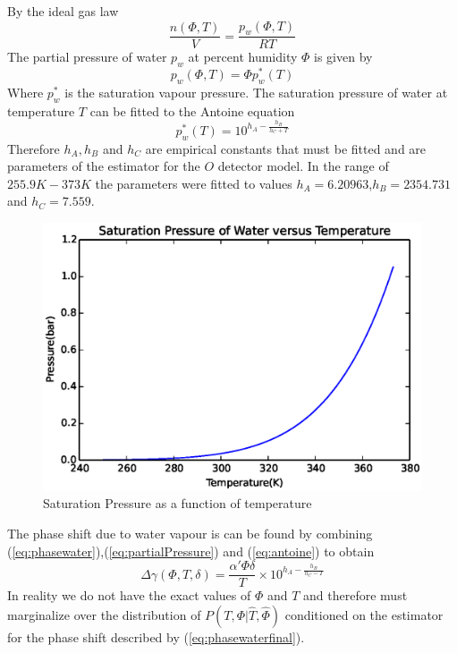 By the ideal gas law 
\begin{equation}
\frac{n(\Phi,T)}{V} = \frac{p_w(\Phi,T)}{RT}
\end{equation}
The partial pressure of water $p_w$ at percent humidity $\Phi$ is given by 
\begin{equation}
p_w(\Phi,T) = \Phi p^*_w(T)
\label{eq:partialPressure}
\end{equation}
Where $p^*_w$ is the saturation vapour pressure.\cite{relativehumidity} The saturation pressure of water at temperature $T$ can be fitted to the Antoine equation \cite{antoineequation}
\begin{equation}
\label{eq:antoine}
p^*_w(T) = 10^{h_A - \frac{h_B}{h_C + T}}
\end{equation} 
Therefore $h_A,h_B$ and $h_C$ are empirical constants that must be fitted and are parameters of the estimator for the $O$ detector model. In the range of $255.9K-373K$ the parameters were fitted to values $h_A=6.20963$,$h_B=2354.731$ and $h_C=7.559$.\cite{antoineequation} 
\begin{figure}[ht!]
\centering
\includegraphics[scale=1.0]{Figures/antoine.eps}
\caption{Saturation Pressure as a function of temperature}
\label{fig:antoine}
\end{figure}
The phase shift due to water vapour is can be found by combining (\ref{eq:phasewater}),(\ref{eq:partialPressure}) and (\ref{eq:antoine}) to obtain
\begin{equation}
\Delta\gamma(\Phi,T,\delta) = \frac{\alpha'\Phi\delta}{T}\times 10^{h_A - \frac{h_B}{h_C - T}}
\label{eq:phasewaterfinal}
\end{equation}
In reality we do not have the exact values of $\Phi$ and $T$ and therefore must marginalize over the distribution of $P(T,\Phi|\hat{T},\hat{\Phi})$ conditioned on the estimator for the phase shift described by (\ref{eq:phasewaterfinal}).
